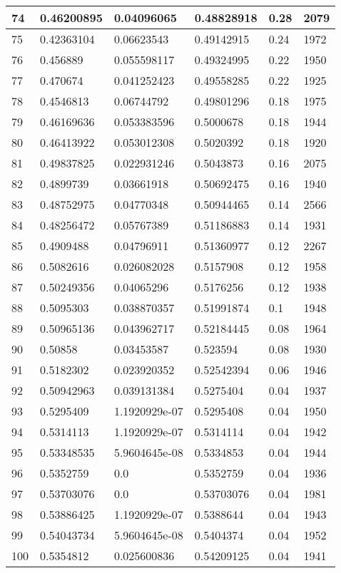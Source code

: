 \begin{longtable}{|l|l|l|l|l|l|}
74 & 0.46200895 & 0.04096065 & 0.48828918 & 0.28 & 2079 \\ \hline 
75 & 0.42363104 & 0.06623543 & 0.49142915 & 0.24 & 1972 \\ \hline 
76 & 0.456889 & 0.055598117 & 0.49324995 & 0.22 & 1950 \\ \hline 
77 & 0.470674 & 0.041252423 & 0.49558285 & 0.22 & 1925 \\ \hline 
78 & 0.4546813 & 0.06744792 & 0.49801296 & 0.18 & 1975 \\ \hline 
79 & 0.46169636 & 0.053383596 & 0.5000678 & 0.18 & 1944 \\ \hline 
80 & 0.46413922 & 0.053012308 & 0.5020392 & 0.18 & 1920 \\ \hline 
81 & 0.49837825 & 0.022931246 & 0.5043873 & 0.16 & 2075 \\ \hline 
82 & 0.4899739 & 0.03661918 & 0.50692475 & 0.16 & 1940 \\ \hline 
83 & 0.48752975 & 0.04770348 & 0.50944465 & 0.14 & 2566 \\ \hline 
84 & 0.48256472 & 0.05767389 & 0.51186883 & 0.14 & 1931 \\ \hline 
85 & 0.4909488 & 0.04796911 & 0.51360977 & 0.12 & 2267 \\ \hline 
86 & 0.5082616 & 0.026082028 & 0.5157908 & 0.12 & 1958 \\ \hline 
87 & 0.50249356 & 0.04065296 & 0.5176256 & 0.12 & 1938 \\ \hline 
88 & 0.5095303 & 0.038870357 & 0.51991874 & 0.1 & 1948 \\ \hline 
89 & 0.50965136 & 0.043962717 & 0.52184445 & 0.08 & 1964 \\ \hline 
90 & 0.50858 & 0.03453587 & 0.523594 & 0.08 & 1930 \\ \hline 
91 & 0.5182302 & 0.023920352 & 0.52542394 & 0.06 & 1946 \\ \hline 
92 & 0.50942963 & 0.039131384 & 0.5275404 & 0.04 & 1937 \\ \hline 
93 & 0.5295409 & 1.1920929e-07 & 0.5295408 & 0.04 & 1950 \\ \hline 
94 & 0.5314113 & 1.1920929e-07 & 0.5314114 & 0.04 & 1942 \\ \hline 
95 & 0.53348535 & 5.9604645e-08 & 0.5334853 & 0.04 & 1944 \\ \hline 
96 & 0.5352759 & 0.0 & 0.5352759 & 0.04 & 1936 \\ \hline 
97 & 0.53703076 & 0.0 & 0.53703076 & 0.04 & 1981 \\ \hline 
98 & 0.53886425 & 1.1920929e-07 & 0.5388644 & 0.04 & 1943 \\ \hline 
99 & 0.54043734 & 5.9604645e-08 & 0.5404374 & 0.04 & 1952 \\ \hline 
100 & 0.5354812 & 0.025600836 & 0.54209125 & 0.04 & 1941 \\ \hline 
\end{longtable}